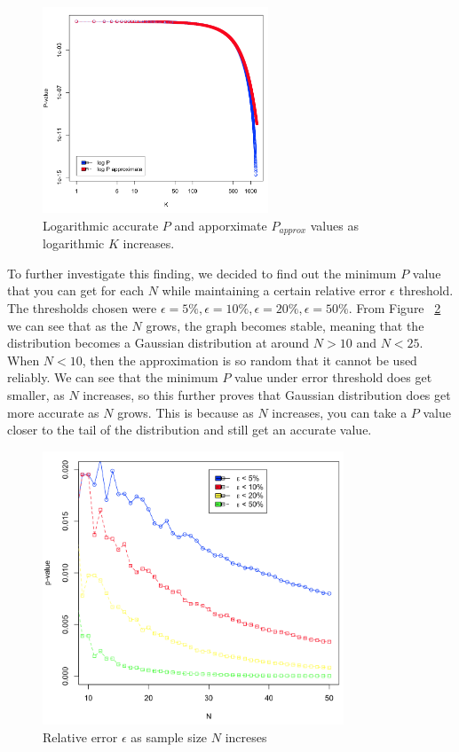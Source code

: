 \documentclass[12pt]{article}
\begin{document}
\begin{figure}[H]
  \centering
  \includegraphics[width=0.6\textwidth]{logPlogPapproxAsKincreases}
  \caption{Logarithmic accurate $P$ and apporximate $P_{approx}$ values as logarithmic $K$ increases.}
  \label{fig:logPlogPapproxAsKincreases}
\end{figure}

To further investigate this finding, we decided to find out the minimum $P$ value that you can get for each $N$ while maintaining a certain relative error $\epsilon$ threshold. The thresholds chosen were $\epsilon=5\%, \epsilon=10\%, \epsilon=20\%, \epsilon=50\%$. From Figure ~\ref{fig:PvsN} we can see that as the $N$ grows, the graph becomes stable, meaning that the distribution becomes a Gaussian distribution at around $N > 10$ and $N < 25$. When $N < 10$, then the approximation is so random that it cannot be used reliably. We can see that the minimum $P$ value under error threshold does get smaller, as $N$ increases, so this further proves that Gaussian distribution does get more accurate as $N$ grows. This is because as $N$ increases, you can take a $P$ value closer to the tail of the distribution and still get an accurate value.

\begin{figure}[H]
  \centering
  \includegraphics[width=0.8\textwidth]{PvsN}
  \caption{Relative error $\epsilon$ as sample size $N$ increses}
  \label{fig:PvsN}
\end{figure}
\end{document}
